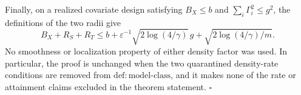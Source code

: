 Finally, on a realized covariate design satisfying \(B_X\le b\) and \(\sum_i\Gamma_i^2\le g^2\), the definitions of the two radii give
\[
B_X+R_S+R_T
\le b+\varepsilon^{-1}\sqrt{2\log(4/\gamma)}\,g
+\sqrt{2\log(4/\gamma)/m}.
\]
No smoothness or localization property of either density factor was used.  In particular, the proof is unchanged when the two quarantined density-rate conditions are removed from \(\mathrm{def:model\text{-}class}\), and it makes none of the rate or attainment claims excluded in the theorem statement. \(\square\)
